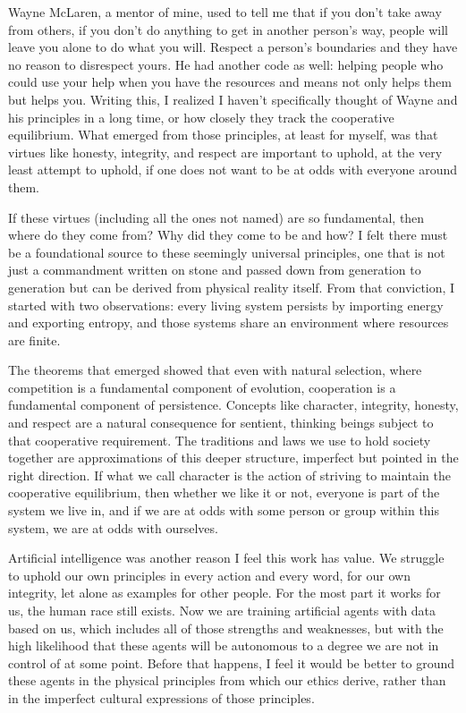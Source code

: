 \documentclass[11pt]{article}
\theoremstyle{plain}
\theoremstyle{definition}
\theoremstyle{remark}
\begin{document}
Wayne McLaren, a mentor of mine, used to tell me that if you don't take
away from others, if you don't do anything to get in another person's
way, people will leave you alone to do what you will. Respect a person's
boundaries and they have no reason to disrespect yours. He had another
code as well: helping people who could use your help when you have the
resources and means not only helps them but helps you. Writing this, I
realized I haven't specifically thought of Wayne and his principles in a
long time, or how closely they track the cooperative equilibrium. What
emerged from those principles, at least for myself, was that virtues
like honesty, integrity, and respect are important to uphold, at the
very least attempt to uphold, if one does not want to be at odds with
everyone around them.

If these virtues (including all the ones not named) are so fundamental,
then where do they come from? Why did they come to be and how? I felt
there must be a foundational source to these seemingly universal
principles, one that is not just a commandment written on stone and
passed down from generation to generation but can be derived from
physical reality itself. From that conviction, I started with two
observations: every living system persists by importing energy and
exporting entropy, and those systems share an environment where
resources are finite.

The theorems that emerged showed that even with natural selection, where
competition is a fundamental component of evolution, cooperation is a
fundamental component of persistence. Concepts like character,
integrity, honesty, and respect are a natural consequence for sentient,
thinking beings subject to that cooperative requirement. The traditions
and laws we use to hold society together are approximations of this
deeper structure, imperfect but pointed in the right direction. If what
we call character is the action of striving to maintain the cooperative
equilibrium, then whether we like it or not, everyone is part of the
system we live in, and if we are at odds with some person or group
within this system, we are at odds with ourselves.

Artificial intelligence was another reason I feel this work has value.
We struggle to uphold our own principles in every action and every word,
for our own integrity, let alone as examples for other people. For the
most part it works for us, the human race still exists. Now we are
training artificial agents with data based on us, which includes all of
those strengths and weaknesses, but with the high likelihood that these
agents will be autonomous to a degree we are not in control of at some
point. Before that happens, I feel it would be better to ground these
agents in the physical principles from which our ethics derive, rather
than in the imperfect cultural expressions of those principles.
\end{document}
